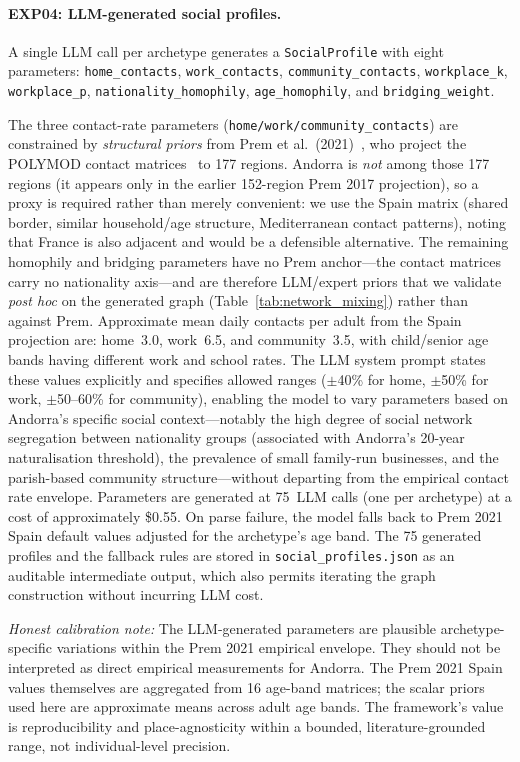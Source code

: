 \documentclass[a4paper,12pt]{article}
\begin{document}
\paragraph{EXP04: LLM-generated social profiles.}
A single LLM call per archetype generates a \texttt{SocialProfile} with eight
parameters: \texttt{home\_contacts}, \texttt{work\_contacts},
\texttt{community\_contacts}, \texttt{workplace\_k}, \texttt{workplace\_p},
\texttt{nationality\_homophily}, \texttt{age\_homophily}, and
\texttt{bridging\_weight}.

The three contact-rate parameters (\texttt{home/work/community\_contacts}) are
constrained by \emph{structural priors} from Prem et al.\
(2021)~\cite{prem2021projecting}, who project the POLYMOD contact
matrices~\cite{mossong2008social} to 177 regions. Andorra is \emph{not} among those
177 regions (it appears only in the earlier 152-region Prem 2017 projection), so a
proxy is required rather than merely convenient: we use the Spain matrix (shared
border, similar household/age structure, Mediterranean contact patterns), noting that
France is also adjacent and would be a defensible alternative. The remaining homophily
and bridging parameters have no Prem anchor---the contact matrices carry no nationality
axis---and are therefore LLM/expert priors that we validate \emph{post hoc} on the
generated graph (Table~\ref{tab:network_mixing}) rather than against Prem. Approximate
mean daily contacts per adult from the Spain projection are: home~3.0, work~6.5, and
community~3.5, with child/senior age bands having different work and school rates. The LLM system
prompt states these values explicitly and specifies allowed ranges ($\pm$40\% for
home, $\pm$50\% for work, $\pm$50--60\% for community), enabling the model to
vary parameters based on Andorra's specific social context---notably the high
degree of social network segregation between nationality groups (associated with
Andorra's 20-year naturalisation threshold), the prevalence of small family-run
businesses, and the parish-based community structure---without departing from
the empirical contact rate envelope. Parameters are generated at 75~LLM calls
(one per archetype) at a cost of approximately \$0.55. On parse failure, the
model falls back to Prem 2021 Spain default values adjusted for the archetype's
age band. The 75 generated profiles and the fallback rules are stored in
\texttt{social\_profiles.json} as an auditable intermediate output, which also
permits iterating the graph construction without incurring LLM cost.

\emph{Honest calibration note:} The LLM-generated parameters are plausible
archetype-specific variations within the Prem 2021 empirical envelope. They
should not be interpreted as direct empirical measurements for Andorra. The
Prem 2021 Spain values themselves are aggregated from 16 age-band matrices;
the scalar priors used here are approximate means across adult age bands.
The framework's value is reproducibility and place-agnosticity within a bounded,
literature-grounded range, not individual-level precision.
\end{document}
